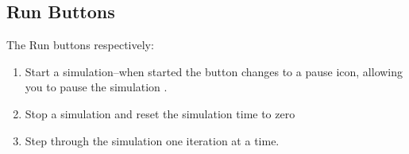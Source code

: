 \subsection{Run Buttons}
\label{RunButtons}


The Run buttons respectively:
\begin{enumerate}
\item    Start a simulation--when started the button changes to a pause icon,
allowing you to pause the simulation .
\item Stop a simulation and reset the simulation time to zero
\item Step through the simulation one iteration at a time.
\end{enumerate}

%

